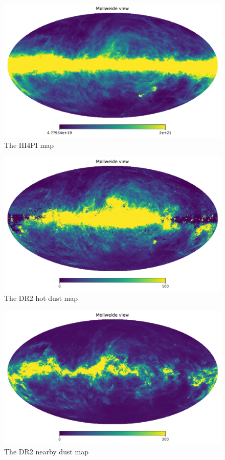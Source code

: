 \documentclass{aa}
\begin{document}
\begin{figure}
  \centering
  \includegraphics[width=\columnwidth]{figures/h14pi.pdf}
  \caption{The HI4PI map}
  \label{fig:h14pi}
\end{figure}
\begin{figure}
  \centering
  \includegraphics[width=\columnwidth]{figures/hot_dust.pdf}
  \caption{The DR2 hot dust map}
  \label{fig:hot_dust}
\end{figure}
\begin{figure}
  \centering
  \includegraphics[width=\columnwidth]{figures/nearby_dust.pdf}
  \caption{The DR2 nearby dust map}
  \label{fig:nearby_dust}
\end{figure}
\end{document}

